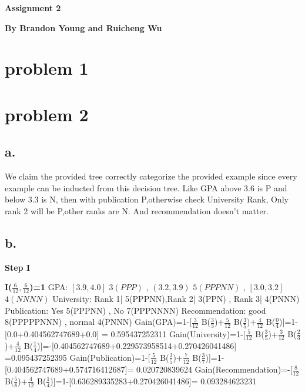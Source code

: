\documentclass[12pt, letterpaper]{article}
\begin{document}
	\textbf{\large Assignment 2}\newline
	
	\textbf{By Brandon Young and Ruicheng Wu}
	\section{problem 1}
	
	
	\section{problem 2}
	\subsection{a.}
	
	We claim the provided tree correctly categorize the provided example since every example can be inducted from this decision tree.
	Like GPA above 3.6 is P and below 3.3 is N, then with publication P,otherwise check University Rank, Only rank 2 will be P,other ranks are N. And recommendation doesn't matter.
	
	\subsection{b.}\large
	\textbf{Step I}
	
	\textbf{I($\frac{6}{12},\frac{6}{12}$)=1}\newline
	GPA: $[3.9,4.0]$ $3(PPP)$ , $(3.2,3.9)$ $5(PPPNN)$ , $[3.0,3.2]$ $4(NNNN)$\newline
	University: Rank 1| 5(PPPNN),Rank 2| 3(PPN) , Rank 3| 4(PNNN)\newline
	Publication: Yes 5(PPPNN) , No 7(PPPNNNN)\newline
	Recommendation: good 8(PPPPPNNN) , normal 4(PNNN)\newline\newline
	Gain(GPA)=1-[$\frac{3}{12}$ B($\frac{3}{3}$)+$\frac{5}{12}$ B($\frac{3}{5}$)+$\frac{4}{12}$ B($\frac{0}{4}$)]=1-[0.0+0.404562747689+0.0]
	= 0.595437252311\newline\newline
	Gain(University)=1-[$\frac{5}{12}$ B($\frac{3}{5}$)+$\frac{3}{12}$ B($\frac{2}{3}$)+$\frac{4}{12}$ B($\frac{1}{4}$)]=-[0.404562747689+0.229573958514+0.270426041486] =0.095437252395\newline\newline
	Gain(Publication)=1-[$\frac{5}{12}$ B($\frac{3}{5}$)+$\frac{7}{12}$ B($\frac{3}{7}$)]=1-[0.404562747689+0.574716412687]= 0.020720839624\newline\newline
	Gain(Recommendation)=-[$\frac{8}{12}$ B($\frac{5}{8}$)+$\frac{4}{12}$ B($\frac{1}{4}$)]=1-[0.636289335283+0.270426041486]= 0.093284623231\newline
	
\end{document}
